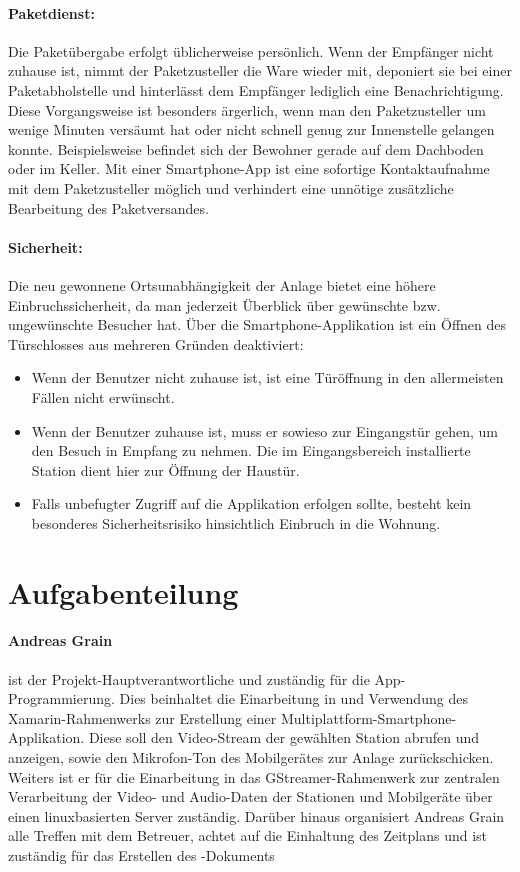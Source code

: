 \paragraph{Paketdienst:}
Die Paketübergabe erfolgt üblicherweise persönlich.
Wenn der Empfänger nicht zuhause ist, nimmt der Paketzusteller die Ware wieder mit, deponiert sie bei einer Paketabholstelle und hinterlässt dem Empfänger lediglich eine Benachrichtigung.
Diese Vorgangsweise ist besonders ärgerlich, wenn man den Paketzusteller um wenige Minuten versäumt hat oder nicht schnell genug zur Innenstelle gelangen konnte.
Beispielsweise befindet sich der Bewohner gerade auf dem Dachboden oder im Keller.
Mit einer Smartphone-App ist eine sofortige Kontaktaufnahme mit dem Paketzusteller möglich und verhindert eine unnötige zusätzliche Bearbeitung des Paketversandes.

\paragraph{Sicherheit:}
Die neu gewonnene Ortsunabhängigkeit der Anlage bietet eine höhere Einbruchssicherheit, da man jederzeit Überblick über gewünschte bzw. ungewünschte Besucher hat.
Über die Smartphone-Applikation ist ein Öffnen des Türschlosses aus mehreren Gründen deaktiviert:
\begin{itemize}
    \item Wenn der Benutzer nicht zuhause ist, ist eine Türöffnung in den allermeisten Fällen nicht erwünscht.
    \item Wenn der Benutzer zuhause ist, muss er sowieso zur Eingangstür gehen, um den Besuch in Empfang zu nehmen. Die im Eingangsbereich installierte Station dient hier zur Öffnung der Haustür.
    \item Falls unbefugter Zugriff auf die Applikation erfolgen sollte, besteht kein besonderes Sicherheitsrisiko hinsichtlich Einbruch in die Wohnung.
\end{itemize}

\section{Aufgabenteilung}
\paragraph{Andreas Grain} ist der Projekt-Hauptverantwortliche und zuständig für die App-Program\-mierung.
Dies beinhaltet die Einarbeitung in und Verwendung des Xamarin-Rahmenwerks zur Erstellung einer Multiplattform-Smartphone-Applikation.
Diese soll den Video-Stream der gewählten Station abrufen und anzeigen, sowie den Mikrofon-Ton des Mobilgerätes zur Anlage zurückschicken.
Weiters ist er für die Einarbeitung in das GStreamer-Rahmenwerk zur zentralen Verarbeitung der Video- und Audio-Daten der Stationen und Mobilgeräte über einen linuxbasierten Server zuständig.
Darüber hinaus organisiert Andreas Grain alle Treffen mit dem Betreuer, achtet auf die Einhaltung des Zeitplans und ist zuständig für das Erstellen des  -Dokuments

